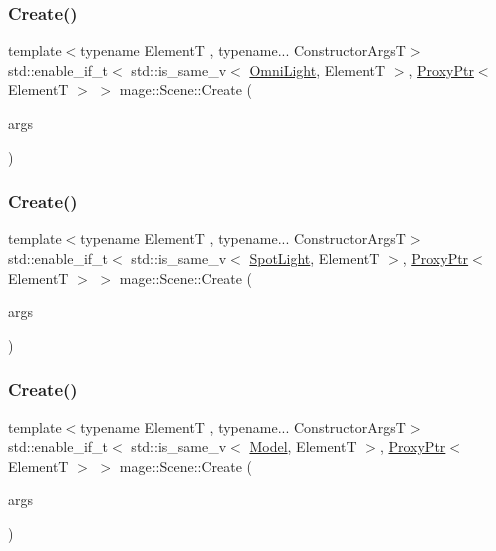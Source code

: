 \subsubsection{\texorpdfstring{Create()}{Create()}\hspace{0.1cm}{\footnotesize\ttfamily [6/11]}}
{\footnotesize\ttfamily template$<$typename ElementT , typename... Constructor\+ArgsT$>$ \\
std\+::enable\+\_\+if\+\_\+t$<$ std\+::is\+\_\+same\+\_\+v$<$ \hyperlink{classmage_1_1_omni_light}{Omni\+Light}, ElementT $>$, \hyperlink{classmage_1_1_proxy_ptr}{Proxy\+Ptr}$<$ ElementT $>$ $>$ mage\+::\+Scene\+::\+Create (\begin{DoxyParamCaption}\item[{Constructor\+ArgsT \&\&...}]{args }\end{DoxyParamCaption})}

\hypertarget{classmage_1_1_scene_a1cd3d70a20c1f46291329d8e853d1552}{}\label{classmage_1_1_scene_a1cd3d70a20c1f46291329d8e853d1552} 
\subsubsection{\texorpdfstring{Create()}{Create()}\hspace{0.1cm}{\footnotesize\ttfamily [7/11]}}
{\footnotesize\ttfamily template$<$typename ElementT , typename... Constructor\+ArgsT$>$ \\
std\+::enable\+\_\+if\+\_\+t$<$ std\+::is\+\_\+same\+\_\+v$<$ \hyperlink{classmage_1_1_spot_light}{Spot\+Light}, ElementT $>$, \hyperlink{classmage_1_1_proxy_ptr}{Proxy\+Ptr}$<$ ElementT $>$ $>$ mage\+::\+Scene\+::\+Create (\begin{DoxyParamCaption}\item[{Constructor\+ArgsT \&\&...}]{args }\end{DoxyParamCaption})}

\hypertarget{classmage_1_1_scene_a6300df61b18b1a64cb89db11924fec46}{}\label{classmage_1_1_scene_a6300df61b18b1a64cb89db11924fec46} 
\subsubsection{\texorpdfstring{Create()}{Create()}\hspace{0.1cm}{\footnotesize\ttfamily [8/11]}}
{\footnotesize\ttfamily template$<$typename ElementT , typename... Constructor\+ArgsT$>$ \\
std\+::enable\+\_\+if\+\_\+t$<$ std\+::is\+\_\+same\+\_\+v$<$ \hyperlink{classmage_1_1_model}{Model}, ElementT $>$, \hyperlink{classmage_1_1_proxy_ptr}{Proxy\+Ptr}$<$ ElementT $>$ $>$ mage\+::\+Scene\+::\+Create (\begin{DoxyParamCaption}\item[{Constructor\+ArgsT \&\&...}]{args }\end{DoxyParamCaption})}

